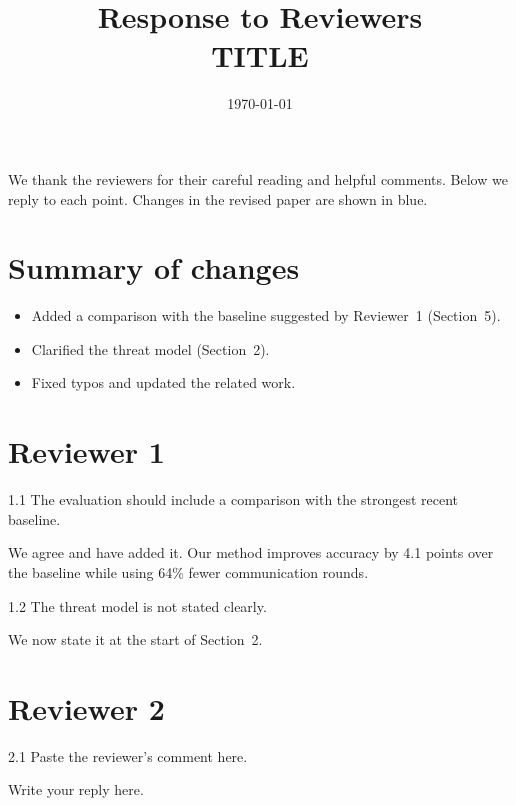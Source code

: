 \documentclass[11pt]{article}
\title{\textbf{Response to Reviewers}\\[0.4em] \large {{TITLE}}}
\author{}
\date{\today}
\newcommand{\change}[1]{\textcolor{blue!65!black}{#1}}
\begin{document}
\maketitle

We thank the reviewers for their careful reading and helpful comments. Below
we reply to each point. Changes in the revised paper are shown
\change{in blue}.

\section*{Summary of changes}
\begin{itemize}
  \item Added a comparison with the baseline suggested by Reviewer~1 (Section~5).
  \item Clarified the threat model (Section~2).
  \item Fixed typos and updated the related work.
\end{itemize}

\section*{Reviewer 1}

\begin{reviewer}{1.1}
The evaluation should include a comparison with the strongest recent baseline.
\end{reviewer}

We agree and have added it. \change{Our method improves accuracy by 4.1 points
over the baseline while using 64\% fewer communication rounds.}

\begin{reviewer}{1.2}
The threat model is not stated clearly.
\end{reviewer}

We now state it at the start of Section~2.

\section*{Reviewer 2}

\begin{reviewer}{2.1}
Paste the reviewer's comment here.
\end{reviewer}

Write your reply here.
\end{document}
